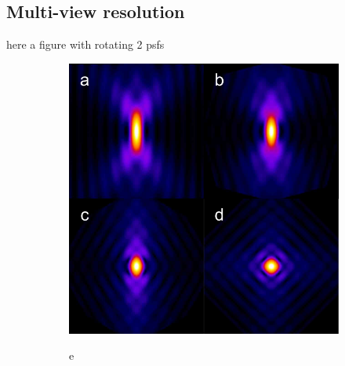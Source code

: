   \subsection{Multi-view resolution}
    here a figure with rotating 2 psfs
    \begin{figure}[bt]
      \centering
      \begin{subfigure}[t]{0.45\textwidth}
        \includegraphics[width=\columnwidth]{simu/psf}
      \end{subfigure}	
      \begin{subfigure}[b]{0.5\textwidth}
      \qquad e
      

\end{subfigure}
\end{figure}
